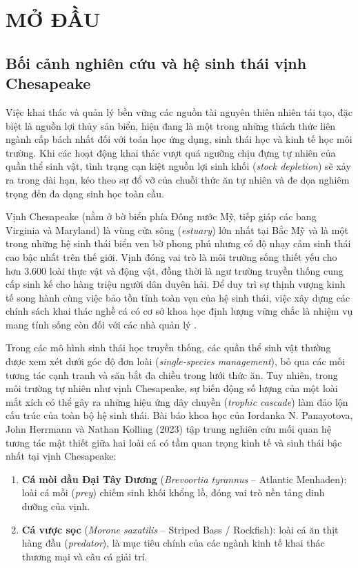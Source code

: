 \chapter{MỞ ĐẦU}
\label{ch:introduction}

\section{Bối cảnh nghiên cứu và hệ sinh thái vịnh Chesapeake}
\label{sec:intro_chesapeake}

Việc khai thác và quản lý bền vững các nguồn tài nguyên thiên nhiên tái tạo, đặc biệt là nguồn lợi thủy sản biển, hiện đang là một trong những thách thức liên ngành cấp bách nhất đối với toán học ứng dụng, sinh thái học và kinh tế học môi trường. Khi các hoạt động khai thác vượt quá ngưỡng chịu đựng tự nhiên của quần thể sinh vật, tình trạng cạn kiệt nguồn lợi sinh khối (\textit{stock depletion}) sẽ xảy ra trong dài hạn, kéo theo sự đổ vỡ của chuỗi thức ăn tự nhiên và đe dọa nghiêm trọng đến đa dạng sinh học toàn cầu.

Vịnh Chesapeake (nằm ở bờ biển phía Đông nước Mỹ, tiếp giáp các bang Virginia và Maryland) là vùng cửa sông (\textit{estuary}) lớn nhất tại Bắc Mỹ và là một trong những hệ sinh thái biển ven bờ phong phú nhưng có độ nhạy cảm sinh thái cao bậc nhất trên thế giới. Vịnh đóng vai trò là môi trường sống thiết yếu cho hơn 3.600 loài thực vật và động vật, đồng thời là ngư trường truyền thống cung cấp sinh kế cho hàng triệu người dân duyên hải. Để duy trì sự thịnh vượng kinh tế song hành cùng việc bảo tồn tính toàn vẹn của hệ sinh thái, việc xây dựng các chính sách khai thác nghề cá có cơ sở khoa học định lượng vững chắc là nhiệm vụ mang tính sống còn đối với các nhà quản lý \cite{panayotova2023bioeconomic}.

Trong các mô hình sinh thái học truyền thống, các quần thể sinh vật thường được xem xét dưới góc độ đơn loài (\textit{single-species management}), bỏ qua các mối tương tác cạnh tranh và săn bắt đa chiều trong lưới thức ăn. Tuy nhiên, trong môi trường tự nhiên như vịnh Chesapeake, sự biến động số lượng của một loài mắt xích có thể gây ra những hiệu ứng dây chuyền (\textit{trophic cascade}) làm đảo lộn cấu trúc của toàn bộ hệ sinh thái. Bài báo khoa học của Iordanka N. Panayotova, John Herrmann và Nathan Kolling (2023) \cite{panayotova2023bioeconomic} tập trung nghiên cứu mối quan hệ tương tác mật thiết giữa hai loài cá có tầm quan trọng kinh tế và sinh thái bậc nhất tại vịnh Chesapeake:
\begin{enumerate}
    \item \textbf{Cá mòi dầu Đại Tây Dương} (\textit{Brevoortia tyrannus} -- Atlantic Menhaden): loài cá mồi (\textit{prey}) chiếm sinh khối khổng lồ, đóng vai trò nền tảng dinh dưỡng của vịnh.
    \item \textbf{Cá vược sọc} (\textit{Morone saxatilis} -- Striped Bass / Rockfish): loài cá ăn thịt hàng đầu (\textit{predator}), là mục tiêu chính của các ngành kinh tế khai thác thương mại và câu cá giải trí.
\end{enumerate}

